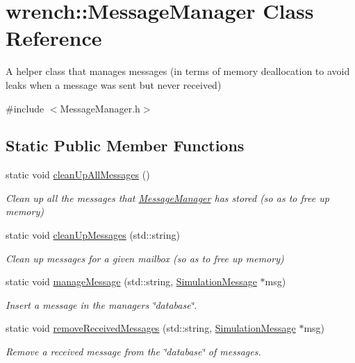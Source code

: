 \hypertarget{classwrench_1_1_message_manager}{}\section{wrench\+:\+:Message\+Manager Class Reference}
\label{classwrench_1_1_message_manager}


A helper class that manages messages (in terms of memory deallocation to avoid leaks when a message was sent but never received)  




{\ttfamily \#include $<$Message\+Manager.\+h$>$}

\subsection*{Static Public Member Functions}
\begin{DoxyCompactItemize}
\item 
\mbox{\label{classwrench_1_1_message_manager_a6b36dba41c782db73fb24a7c6ac50713}} 
static void \hyperlink{classwrench_1_1_message_manager_a6b36dba41c782db73fb24a7c6ac50713}{clean\+Up\+All\+Messages} ()
\begin{DoxyCompactList}\small\item\em Clean up all the messages that \hyperlink{classwrench_1_1_message_manager}{Message\+Manager} has stored (so as to free up memory) \end{DoxyCompactList}\item 
static void \hyperlink{classwrench_1_1_message_manager_a24d0ac978cf92cb70f98b308bd300487}{clean\+Up\+Messages} (std\+::string)
\begin{DoxyCompactList}\small\item\em Clean up messages for a given mailbox (so as to free up memory) \end{DoxyCompactList}\item 
static void \hyperlink{classwrench_1_1_message_manager_aac4ff7331cc629bae0f74837d650d083}{manage\+Message} (std\+::string, \hyperlink{classwrench_1_1_simulation_message}{Simulation\+Message} $\ast$msg)
\begin{DoxyCompactList}\small\item\em Insert a message in the manager\textquotesingle{}s \char`\"{}database\char`\"{}. \end{DoxyCompactList}\item 
static void \hyperlink{classwrench_1_1_message_manager_a695fec33d8c5b8682ea97d4f66988b51}{remove\+Received\+Messages} (std\+::string, \hyperlink{classwrench_1_1_simulation_message}{Simulation\+Message} $\ast$msg)
\begin{DoxyCompactList}\small\item\em Remove a received message from the \char`\"{}database\char`\"{} of messages. \end{DoxyCompactList}\end{DoxyCompactItemize}


